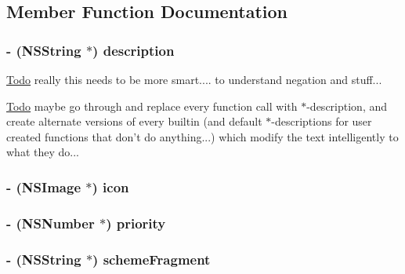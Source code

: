 \subsection{Member Function Documentation}
\hypertarget{interface_c_m_rule_51963c06e66c9a9d7ca93720b4aa71c6}{
\subsubsection[description]{\setlength{\rightskip}{0pt plus 5cm}- ({\bf NSString} $\ast$) description }}
\label{interface_c_m_rule_51963c06e66c9a9d7ca93720b4aa71c6}




\begin{Desc}
\item[\hyperlink{todo__todo000005}{Todo}]really this needs to be more smart.... to understand negation and stuff... \end{Desc}


\begin{Desc}
\item[\hyperlink{todo__todo000005}{Todo}]maybe go through and replace every function call with $\ast$-description, and create alternate versions of every builtin (and default $\ast$-descriptions for user created functions that don't do anything...) which modify the text intelligently to what they do... \end{Desc}
\hypertarget{interface_c_m_rule_5ab693404be3d6c9c23d32bf4aeba7b9}{
\subsubsection[icon]{\setlength{\rightskip}{0pt plus 5cm}- (NSImage $\ast$) {\bf icon} }}
\label{interface_c_m_rule_5ab693404be3d6c9c23d32bf4aeba7b9}


\hypertarget{interface_c_m_rule_aa7715326f511deb561ac41501a194f9}{
\subsubsection[priority]{\setlength{\rightskip}{0pt plus 5cm}- (NSNumber $\ast$) priority }}
\label{interface_c_m_rule_aa7715326f511deb561ac41501a194f9}


\hypertarget{interface_c_m_rule_02379e3a0f736406489213d7383c30ef}{
\subsubsection[schemeFragment]{\setlength{\rightskip}{0pt plus 5cm}- ({\bf NSString} $\ast$) {\bf schemeFragment} }}
\label{interface_c_m_rule_02379e3a0f736406489213d7383c30ef}


